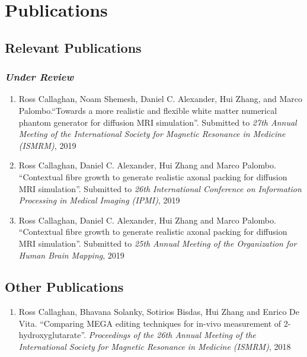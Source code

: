 


\setcounter{chapter}{1}
\chapter*{Publications}

\section*{Relevant Publications}
\subsection*{\emph{Under Review}}
\begin{enumerate}
\item Ross Callaghan, Noam Shemesh, Daniel C. Alexander, Hui Zhang, and Marco Palombo.``Towards a more realistic and flexible white matter numerical phantom generator for diffusion MRI simulation''. Submitted to \emph{27th Annual Meeting of the International Society for Magnetic Resonance in Medicine (ISMRM)}, 2019
\item Ross Callaghan, Daniel C. Alexander, Hui Zhang and Marco Palombo. ``Contextual fibre growth to generate realistic axonal packing for diffusion MRI simulation''. Submitted to \emph{26th International Conference on Information Processing in Medical Imaging (IPMI)}, 2019
\item Ross Callaghan, Daniel C. Alexander, Hui Zhang and Marco Palombo. ``Contextual fibre growth to generate realistic axonal packing for diffusion MRI simulation''. Submitted to \emph{25th Annual Meeting of the  Organization for Human Brain Mapping}, 2019
\end{enumerate}


\section*{Other Publications}
\begin{enumerate}
\item Ross Callaghan, Bhavana Solanky, Sotirios Bisdas, Hui Zhang and Enrico De Vita. ``Comparing MEGA editing techniques for in-vivo measurement of 2-hydroxyglutarate''. \emph{Proceedings of the 26th Annual Meeting of the International Society for Magnetic Resonance in Medicine (ISMRM)}, 2018
\end{enumerate}


